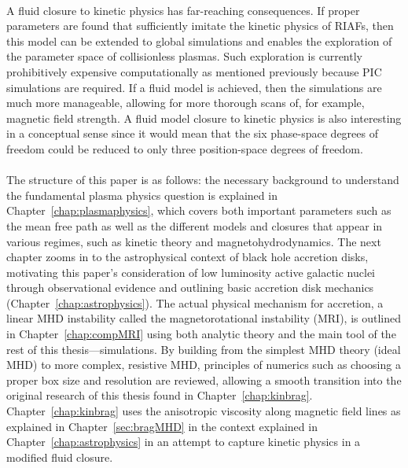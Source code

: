 \\
A fluid closure to kinetic physics has far-reaching consequences. If proper parameters are found that sufficiently imitate the kinetic physics of RIAFs, then this model can be extended to global simulations and enables the exploration of the parameter space of collisionless plasmas. Such exploration is currently prohibitively expensive computationally as mentioned previously because PIC simulations are required. If a fluid model is achieved, then the simulations are much more manageable, allowing for more thorough scans of, for example, magnetic field strength. A fluid model closure to kinetic physics is also interesting in a conceptual sense since it would mean that the six phase-space degrees of freedom could be reduced to only three position-space degrees of freedom. \\
\\
The structure of this paper is as follows: the necessary background to understand the fundamental plasma physics question is explained in Chapter~\ref{chap:plasmaphysics}, which covers both important parameters such as the mean free path as well as the different models and closures that appear in various regimes, such as kinetic theory and magnetohydrodynamics. The next chapter zooms in to the astrophysical context of black hole accretion disks, motivating this paper's consideration of low luminosity active galactic nuclei through observational evidence and outlining basic accretion disk mechanics (Chapter~\ref{chap:astrophysics}). The actual physical mechanism for accretion, a linear MHD instability called the magnetorotational instability (MRI), is outlined in Chapter~\ref{chap:compMRI} using both analytic theory and the main tool of the rest of this thesis---simulations. By building from the simplest MHD theory (ideal MHD) to more complex, resistive MHD, principles of numerics such as choosing a proper box size and resolution are reviewed, allowing a smooth transition into the original research of this thesis found in Chapter~\ref{chap:kinbrag}. Chapter~\ref{chap:kinbrag} uses the anisotropic viscosity along magnetic field lines as explained in Chapter~\ref{sec:bragMHD} in the context explained in Chapter~\ref{chap:astrophysics} in an attempt to capture kinetic physics in a modified fluid closure. 

